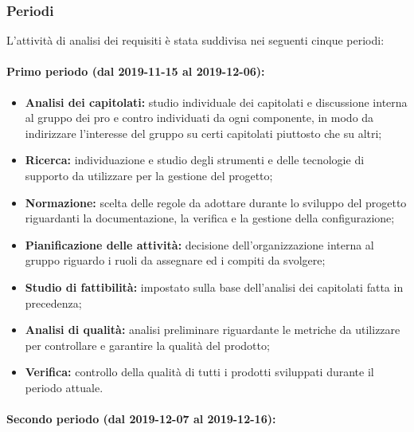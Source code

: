 		\subsubsection{Periodi}
		
			L'attività di analisi dei requisiti è stata suddivisa nei seguenti cinque periodi:
			
			\paragraph{Primo periodo (dal 2019-11-15 al 2019-12-06):}
			
				\begin{itemize}
					\item \textbf{Analisi dei capitolati:} studio individuale dei capitolati e discussione interna al gruppo dei pro e contro individuati da ogni componente, in modo da indirizzare l'interesse del gruppo su certi capitolati piuttosto che su altri;
					\item \textbf{Ricerca:} individuazione e studio degli strumenti e delle tecnologie di supporto da utilizzare per la gestione del progetto;
					\item \textbf{Normazione:} scelta delle regole da adottare durante lo sviluppo del progetto riguardanti la documentazione, la verifica e la gestione della configurazione;
					\item \textbf{Pianificazione delle attività:} decisione dell'organizzazione interna al gruppo riguardo i ruoli da assegnare ed i compiti da svolgere;
					\item \textbf{Studio di fattibilità:} impostato sulla base dell'analisi dei capitolati fatta in precedenza;
					\item \textbf{Analisi di qualità:} analisi preliminare riguardante le metriche da utilizzare per controllare e garantire la qualità del prodotto;
					\item \textbf{Verifica:} controllo della qualità di tutti i prodotti sviluppati durante il periodo attuale.
				\end{itemize}
			
			\paragraph{Secondo periodo (dal 2019-12-07 al 2019-12-16):}
			
